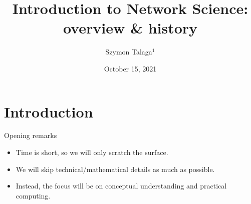 \documentclass[
    hyperref={colorlinks,linkcolor=blue,urlcolor=blue,citecolor=blue}
]{beamer}
\begin{document}
\title[Introduction to Network Science]{
    Introduction to Network Science: overview \& history
}
\author{Szymon Talaga$^1$}
\date{
    October 15, 2021 \\
} %

\frame{\titlepage}

\section{Introduction}

\begin{frame}{Opening remarks}
\begin{itemize}
    \item<2-> Time is short, so we will only scratch the surface.
    \item<3-> We will skip technical/mathematical details as much as possible.
    \item<4-> Instead, the focus will be on conceptual understanding and
    practical computing.
\end{itemize}
\end{frame}
\end{document}
